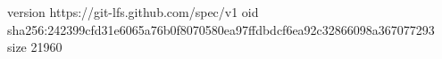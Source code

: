 version https://git-lfs.github.com/spec/v1
oid sha256:242399cfd31e6065a76b0f8070580ea97ffdbdcf6ea92c32866098a367077293
size 21960
